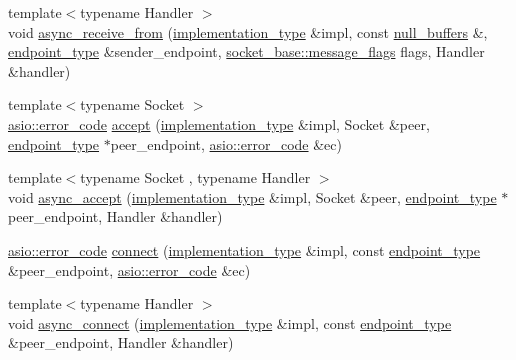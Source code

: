 \begin{DoxyCompactItemize}
\item 
{\footnotesize template$<$typename Handler $>$ }\\void \hyperlink{classasio_1_1detail_1_1reactive__socket__service_a84209799c11b4de98743aacdee4807d4}{async\+\_\+receive\+\_\+from} (\hyperlink{structasio_1_1detail_1_1reactive__socket__service_1_1implementation__type}{implementation\+\_\+type} \&impl, const \hyperlink{classasio_1_1null__buffers}{null\+\_\+buffers} \&, \hyperlink{classasio_1_1detail_1_1reactive__socket__service_adad302be53c8a4ea6e7693bc88595381}{endpoint\+\_\+type} \&sender\+\_\+endpoint, \hyperlink{classasio_1_1socket__base_ac3cf77465dfedfe1979b5415cf32cc94}{socket\+\_\+base\+::message\+\_\+flags} flags, Handler \&handler)
\item 
{\footnotesize template$<$typename Socket $>$ }\\\hyperlink{classasio_1_1error__code}{asio\+::error\+\_\+code} \hyperlink{classasio_1_1detail_1_1reactive__socket__service_aeef5172b432d000a54d31790a60b3854}{accept} (\hyperlink{structasio_1_1detail_1_1reactive__socket__service_1_1implementation__type}{implementation\+\_\+type} \&impl, Socket \&peer, \hyperlink{classasio_1_1detail_1_1reactive__socket__service_adad302be53c8a4ea6e7693bc88595381}{endpoint\+\_\+type} $\ast$peer\+\_\+endpoint, \hyperlink{classasio_1_1error__code}{asio\+::error\+\_\+code} \&ec)
\item 
{\footnotesize template$<$typename Socket , typename Handler $>$ }\\void \hyperlink{classasio_1_1detail_1_1reactive__socket__service_a7548c34b16613edddb13e760ce8f2d0a}{async\+\_\+accept} (\hyperlink{structasio_1_1detail_1_1reactive__socket__service_1_1implementation__type}{implementation\+\_\+type} \&impl, Socket \&peer, \hyperlink{classasio_1_1detail_1_1reactive__socket__service_adad302be53c8a4ea6e7693bc88595381}{endpoint\+\_\+type} $\ast$peer\+\_\+endpoint, Handler \&handler)
\item 
\hyperlink{classasio_1_1error__code}{asio\+::error\+\_\+code} \hyperlink{classasio_1_1detail_1_1reactive__socket__service_af1dfbeb2c7ba4806c97a679e001a1322}{connect} (\hyperlink{structasio_1_1detail_1_1reactive__socket__service_1_1implementation__type}{implementation\+\_\+type} \&impl, const \hyperlink{classasio_1_1detail_1_1reactive__socket__service_adad302be53c8a4ea6e7693bc88595381}{endpoint\+\_\+type} \&peer\+\_\+endpoint, \hyperlink{classasio_1_1error__code}{asio\+::error\+\_\+code} \&ec)
\item 
{\footnotesize template$<$typename Handler $>$ }\\void \hyperlink{classasio_1_1detail_1_1reactive__socket__service_a1a07680e44b66d1e5f5c3a8c9e048de6}{async\+\_\+connect} (\hyperlink{structasio_1_1detail_1_1reactive__socket__service_1_1implementation__type}{implementation\+\_\+type} \&impl, const \hyperlink{classasio_1_1detail_1_1reactive__socket__service_adad302be53c8a4ea6e7693bc88595381}{endpoint\+\_\+type} \&peer\+\_\+endpoint, Handler \&handler)
\end{DoxyCompactItemize}
